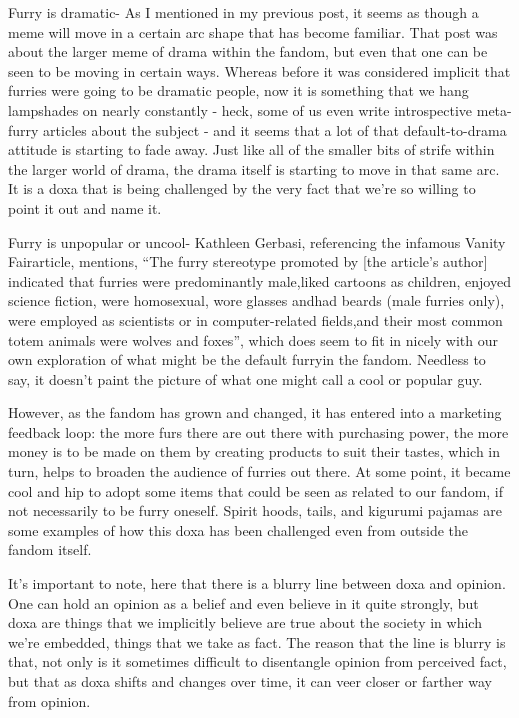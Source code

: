 Furry is dramatic- As I mentioned in my previous post, it seems as though a meme will move in a certain arc shape that has become familiar. That post was about the larger meme of drama within the fandom, but even that one can be seen to be moving in certain ways. Whereas before it was considered implicit that furries were going to be dramatic people, now it is something that we hang lampshades on nearly constantly - heck, some of us even write introspective meta-furry articles about the subject - and it seems that a lot of that default-to-drama attitude is starting to fade away. Just like all of the smaller bits of strife within the larger world of drama, the drama itself is starting to move in that same arc. It is a doxa that is being challenged by the very fact that we're so willing to point it out and name it.

Furry is unpopular or uncool- Kathleen Gerbasi, referencing the infamous Vanity Fairarticle, mentions, ``The furry stereotype promoted by {[}the article's author{]} indicated that furries were predominantly male,liked cartoons as children, enjoyed science fiction, were homosexual, wore glasses andhad beards (male furries only), were employed as scientists or in computer-related fields,and their most common totem animals were wolves and foxes'', which does seem to fit in nicely with our own exploration of what might be the default furryin the fandom. Needless to say, it doesn't paint the picture of what one might call a cool or popular guy.

However, as the fandom has grown and changed, it has entered into a marketing feedback loop: the more furs there are out there with purchasing power, the more money is to be made on them by creating products to suit their tastes, which in turn, helps to broaden the audience of furries out there. At some point, it became cool and hip to adopt some items that could be seen as related to our fandom, if not necessarily to be furry oneself. Spirit hoods, tails, and kigurumi pajamas are some examples of how this doxa has been challenged even from outside the fandom itself.

It's important to note, here that there is a blurry line between doxa and opinion. One can hold an opinion as a belief and even believe in it quite strongly, but doxa are things that we implicitly believe are true about the society in which we're embedded, things that we take as fact. The reason that the line is blurry is that, not only is it sometimes difficult to disentangle opinion from perceived fact, but that as doxa shifts and changes over time, it can veer closer or farther way from opinion.

